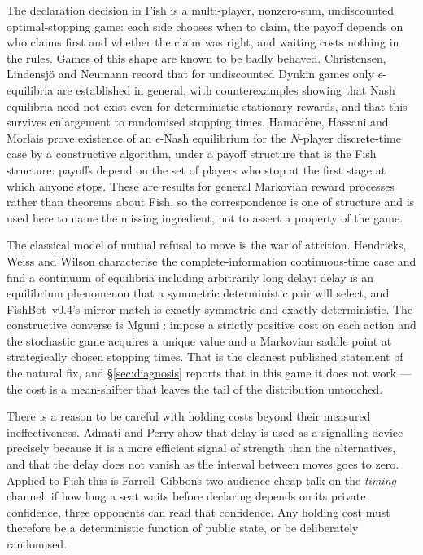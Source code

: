 \documentclass[11pt]{article}
\theoremstyle{definition}
\DeclareRobustCommand{\vfour}{\texorpdfstring{\mbox{FishBot v0.4}}{FishBot v0.4}}
\begin{document}
The declaration decision in Fish is a multi-player, nonzero-sum, undiscounted
optimal-stopping game: each side chooses when to claim, the payoff depends on who
claims first and whether the claim was right, and waiting costs nothing in the
rules. Games of this shape are known to be badly behaved. Christensen,
Lindensj\"o and Neumann \cite{christensen-dynkin} record that for undiscounted
Dynkin games only $\epsilon$-equilibria are established in general, with
counterexamples showing that Nash equilibria need not exist even for
deterministic stationary rewards, and that this survives enlargement to
randomised stopping times. Hamad\`ene, Hassani and Morlais
\cite{hamadene-dynkin} prove existence of an $\epsilon$-Nash equilibrium for the
$N$-player discrete-time case by a constructive algorithm, under a payoff
structure that is the Fish structure: payoffs depend on the set of players who
stop at the first stage at which anyone stops. These are results for general
Markovian reward processes rather than theorems about Fish, so the correspondence
is one of structure and is used here to name the missing ingredient, not to
assert a property of the game.

The classical model of mutual refusal to move is the war of attrition. Hendricks,
Weiss and Wilson \cite{hendricks-attrition} characterise the complete-information
continuous-time case and find a continuum of equilibria including arbitrarily
long delay: delay is an equilibrium phenomenon that a symmetric deterministic
pair will select, and \vfour{}'s mirror match is exactly symmetric and exactly
deterministic. The constructive converse is Mguni \cite{mguni-actioncost}: impose
a strictly positive cost on each action and the stochastic game acquires a unique
value and a Markovian saddle point at strategically chosen stopping times. That
is the cleanest published statement of the natural fix, and \S\ref{sec:diagnosis}
reports that in this game it does not work --- the cost is a mean-shifter that
leaves the tail of the distribution untouched.

There is a reason to be careful with holding costs beyond their measured
ineffectiveness. Admati and Perry \cite{admati-perry} show that delay is used as
a signalling device precisely because it is a more efficient signal of strength
than the alternatives, and that the delay does not vanish as the interval between
moves goes to zero. Applied to Fish this is Farrell--Gibbons two-audience cheap
talk \cite{farrell-gibbons} on the \emph{timing} channel: if how long a seat
waits before declaring depends on its private confidence, three opponents can
read that confidence. Any holding cost must therefore be a deterministic function
of public state, or be deliberately randomised.
\end{document}
